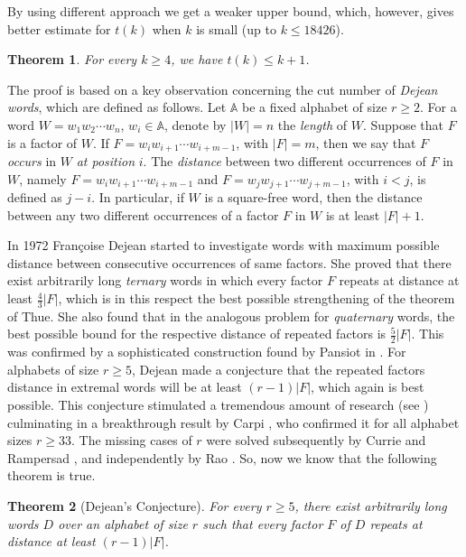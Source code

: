 \documentclass[12pt]{amsart}
\newtheorem{theorem}{Theorem}
\theoremstyle{plain}
\numberwithin{equation}{section}
\begin{document}
By using different approach we get a weaker upper bound, which, however, gives better estimate for $t(k)$ when $k$ is small (up to $k\leqslant 18426$).

\begin{theorem}\label{Theorem Main t(k)}
For every $k\geqslant 4$, we have $t(k)\leqslant k+1$.
\end{theorem}

The proof is based on a key observation concerning the cut number of \emph{Dejean words}, which are defined as follows. Let $\mathbb{A}$ be a fixed alphabet of size $r\geqslant 2$. For a word $W=w_1w_2\cdots w_n$, $w_i\in\mathbb{A}$, denote by $|W|=n$ the \emph{length} of $W$. Suppose that $F$ is a factor of $W$. If $F=w_iw_{i+1}\cdots w_{i+m-1}$, with $|F|=m$, then we say that $F$ \emph{occurs} in $W$ \emph{at position} $i$. The \emph{distance} between two different occurrences of $F$ in $W$, namely $F=w_{i}w_{i+1}\cdots w_{i+m-1}$ and $F=w_{j}w_{j+1}\cdots w_{j+m-1}$, with $i<j$, is defined as $j-i$. In particular, if $W$ is a square-free word, then the distance between any two different occurrences of a factor $F$ in $W$ is at least $|F|+1$.

In 1972 Fran\c{c}oise Dejean \cite{Dejean1972} started to investigate words with maximum possible distance between consecutive occurrences of same factors. She proved \cite{Dejean1972} that there exist arbitrarily long \emph{ternary} words in which every factor $F$ repeats at distance at least $\frac{4}{3}|F|$, which is in this respect the best possible strengthening of the theorem of Thue. She also found \cite{Dejean1972} that in the analogous problem for \emph{quaternary} words, the best possible bound for the respective distance of repeated factors is $\frac{5}{2}|F|$. This was confirmed by a sophisticated construction found by Pansiot in \cite{Pan1984}. For alphabets of size $r\geqslant 5$, Dejean made a conjecture \cite{Dejean1972} that the repeated factors distance in extremal words will be at least $(r-1)|F|$, which again is best possible. This conjecture stimulated a tremendous amount of research (see \cite{Moh2007, Oll1992, Pan1984}) culminating in a breakthrough result by Carpi \cite{Carpi2007}, who confirmed it for all alphabet sizes $r\geqslant 33$. The missing cases of
 $r$ were solved subsequently by Currie and Rampersad \cite{CurrieRampersad}, and independently by Rao \cite{Rao2011}. So, now we know that the following theorem is true.

\begin{theorem}[Dejean's Conjecture]\label{Theorem Dejean}
	For every $r\geqslant 5$, there exist arbitrarily long words $D$ over an alphabet of size $r$ such that every factor $F$ of $D$ repeats at distance at least $(r-1)|F|$.
\end{theorem}
\end{document}
